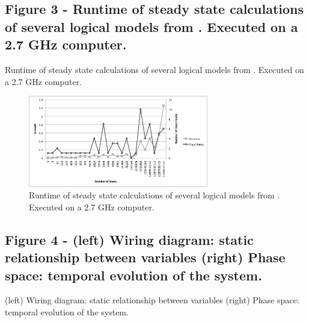 \documentclass[10pt]{bmc_article}
\newenvironment{bmcformat}{\fussy\setboolean{publ}{true}}{\fussy}
\begin{document}
\begin{bmcformat}
	


	\subsection*{Figure 3 - Runtime of steady state calculations of several logical models from \cite{GINsimRepo}. Executed on a 2.7 GHz computer.}
	      Runtime of steady state calculations of several logical models from \cite{GINsimRepo}. Executed on a 2.7 GHz computer.
	
		\begin{figure}[htb]
			\centering
			\includegraphics[width=0.7\textwidth]{GINSimChart.png}
			\caption{Runtime of steady state calculations of several logical models from
				\cite{GINsimRepo}. Executed on a 2.7 GHz computer.}
			\label{fig:chart}
		\end{figure}
	
	
	
		\subsection*{Figure 4 - (left) Wiring diagram: static relationship between variables (right) Phase space: temporal evolution of the system.}
		(left) Wiring diagram: static relationship between variables (right) Phase space: temporal evolution of the system.
		

\end{bmcformat}
\end{document}
